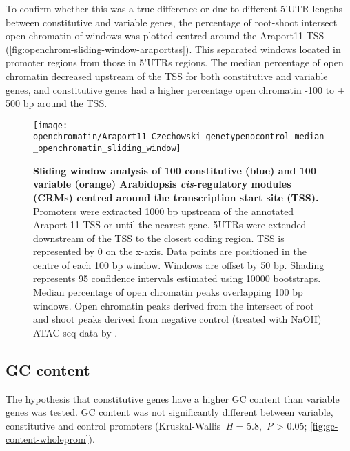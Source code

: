 \documentclass[../main.tex]{subfiles}
\begin{document}
To confirm whether this was a true difference or due to different 5'UTR lengths between constitutive and variable genes, the percentage of root\hyp{}shoot intersect open chromatin of windows was plotted centred around the Araport11 TSS (\autoref{fig:openchrom-sliding-window-araporttss}).
This separated windows located in promoter regions from those in 5'UTRs regions.
The median percentage of open chromatin decreased upstream of the TSS for both constitutive and variable genes, and constitutive genes had a higher percentage open chromatin -100 to + 500 bp around the TSS.



\begin{figure}[!hbt]
	\begin{center}
		\capstart
		\texttt{[image: openchromatin/Araport11\_Czechowski\_genetypenocontrol\_median\_openchromatin\_sliding\_window]}
		\caption{
			\textbf{Sliding window analysis of 100 constitutive (blue) and 100 variable (orange) Arabidopsis \textit{cis}\hyp{}regulatory modules (CRMs) centred around the transcription start site (TSS).}
			Promoters were extracted 1000 bp upstream of the annotated Araport 11 \autocite{chengAraport11CompleteReannotation2017} TSS or until the nearest gene.
			5UTRs were extended downstream of the TSS to the closest coding region.
			TSS is represented by 0 on the x-axis.
			Data points are positioned in the centre of each 100 bp window.
			Windows are offset by 50 bp.
			Shading represents 95 confidence intervals estimated using 10000 bootstraps.
			Median percentage of open chromatin peaks overlapping 100 bp windows. Open chromatin peaks derived from the intersect of root and shoot peaks derived from negative control (treated with NaOH) ATAC\hyp{}seq data by \textcite{potterCytokininModulatesContextdependent2018}.		
			\label{fig:openchrom-sliding-window-araporttss}
		}
	\end{center}
\end{figure}


\subsection{GC content}
The hypothesis that constitutive genes have a higher GC content than variable genes was tested.
GC content was not significantly different between variable, constitutive and control promoters (Kruskal\hyp{}Wallis~\textit{H} = 5.8,~\textit{P} \textgreater{} 0.05; \autoref{fig:gc-content-wholeprom}).
\end{document}
